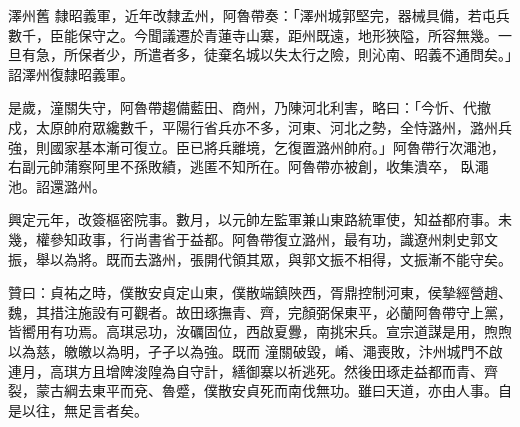 \begin{pinyinscope}
 澤州舊
 隸昭義軍，近年改隸孟州，阿魯帶奏：「澤州城郭堅完，器械具備，若屯兵數千，臣能保守之。今聞議遷於青蓮寺山寨，距州既遠，地形狹隘，所容無幾。一旦有急，所保者少，所遣者多，徒棄名城以失太行之險，則沁南、昭義不通問矣。」詔澤州復隸昭義軍。



 是歲，潼關失守，阿魯帶趨備藍田、商州，乃陳河北利害，略曰：「今忻、代撤戍，太原帥府眾纔數千，平陽行省兵亦不多，河東、河北之勢，全恃潞州，潞州兵強，則國家基本漸可復立。臣已將兵離境，乞復置潞州帥府。」阿魯帶行次澠池，右副元帥蒲察阿里不孫敗績，逃匿不知所在。阿魯帶亦被創，收集潰卒，
 臥澠池。詔還潞州。



 興定元年，改簽樞密院事。數月，以元帥左監軍兼山東路統軍使，知益都府事。未幾，權參知政事，行尚書省于益都。阿魯帶復立潞州，最有功，識遼州刺史郭文振，舉以為將。既而去潞州，張開代領其眾，與郭文振不相得，文振漸不能守矣。



 贊曰：貞祐之時，僕散安貞定山東，僕散端鎮陜西，胥鼎控制河東，侯摯經營趙、魏，其措注施設有可觀者。故田琢撫青、齊，完顏弼保東平，必蘭阿魯帶守上黨，皆嚮用有功焉。高琪忌功，汝礪固位，西啟夏釁，南挑宋兵。宣宗道謀是用，煦煦以為慈，皦皦以為明，孑孑以為強。既而
 潼關破毀，崤、澠喪敗，汴州城門不啟連月，高琪方且增陴浚隍為自守計，繕御寨以祈逃死。然後田琢走益都而青、齊裂，蒙古綱去東平而兗、魯蹙，僕散安貞死而南伐無功。雖曰天道，亦由人事。自是以往，無足言者矣。



\end{pinyinscope}
